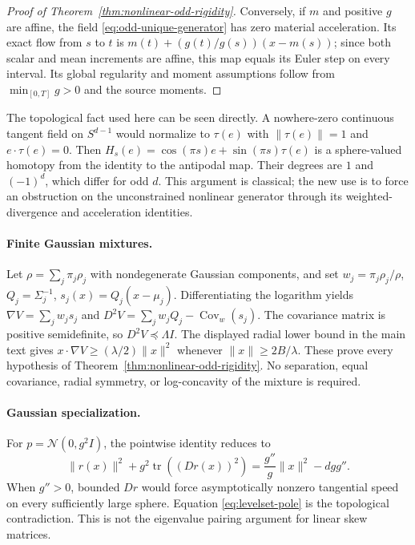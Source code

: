 \begin{proof}[Proof of Theorem~\ref{thm:nonlinear-odd-rigidity}]
Conversely, if $m$ and positive $g$ are affine, the field
\eqref{eq:odd-unique-generator} has zero material acceleration.  Its
exact flow from $s$ to $t$ is
$m(t)+(g(t)/g(s))(x-m(s))$; since both scalar and mean increments are
affine, this map equals its Euler step on every interval.  Its global
regularity and moment assumptions follow from $\min_{[0,T]}g>0$ and
the source moments.
\end{proof}

The topological fact used here can be seen directly.  A nowhere-zero
continuous tangent field on $S^{d-1}$ would normalize to $\tau(e)$ with
$\|\tau(e)\|=1$ and $e\cdot\tau(e)=0$.  Then
$H_s(e)=\cos(\pi s)e+\sin(\pi s)\tau(e)$ is a sphere-valued homotopy
from the identity to the antipodal map.  Their degrees are $1$ and
$(-1)^d$, which differ for odd $d$.  This argument is classical; the
new use is to force an obstruction on the unconstrained nonlinear
generator through its weighted-divergence and acceleration identities.

\paragraph{Finite Gaussian mixtures.}
Let $\rho=\sum_j\pi_j\rho_j$ with nondegenerate Gaussian components,
and set $w_j=\pi_j\rho_j/\rho$, $Q_j=\Sigma_j^{-1}$,
$s_j(x)=Q_j(x-\mu_j)$.  Differentiating the logarithm yields
$\nabla V=\sum_jw_js_j$ and
$D^2V=\sum_jw_jQ_j-\operatorname{Cov}_w(s_j)$.
The covariance matrix is positive semidefinite, so
$D^2V\preceq\Lambda I$.  The displayed radial lower bound in the
main text gives $x\cdot\nabla V\ge(\lambda/2)\|x\|^2$ whenever
$\|x\|\ge2B/\lambda$.  These prove every hypothesis of
Theorem~\ref{thm:nonlinear-odd-rigidity}.  No separation, equal covariance,
radial symmetry, or log-concavity of the mixture is required.

\paragraph{Gaussian specialization.}
For $p=\mathcal N(0,g^2I)$, the pointwise identity reduces to
\begin{equation}
 \|r(x)\|^2+g^2\operatorname{tr}((Dr(x))^2)
 =\frac{g''}{g}\|x\|^2-dgg''.
 \label{eq:gaussian-pointwise-parity}
\end{equation}
When $g''>0$, bounded $Dr$ would force asymptotically nonzero tangential
speed on every sufficiently large sphere.  Equation
\eqref{eq:levelset-pole} is the topological contradiction.  This is not
the eigenvalue pairing argument for linear skew matrices.

